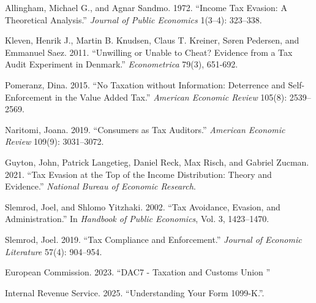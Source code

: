 \documentclass[11pt]{article}
\begin{document}
\newpage
\begin{thebibliography}{9}\small
{}
Allingham, Michael G., and Agnar Sandmo. 1972. ``Income Tax Evasion: A Theoretical Analysis.'' \textit{Journal of Public Economics} 1(3--4): 323--338.

Kleven, Henrik J., Martin B. Knudsen, Claus T. Kreiner, S\o ren Pedersen, and Emmanuel Saez. 2011. ``Unwilling or Unable to Cheat? Evidence from a Tax Audit Experiment in Denmark.'' \textit{Econometrica} 79(3), 651-692.

Pomeranz, Dina. 2015. ``No Taxation without Information: Deterrence and Self-Enforcement in the Value Added Tax.'' \textit{American Economic Review} 105(8): 2539--2569.

Naritomi, Joana. 2019. ``Consumers as Tax Auditors.'' \textit{American Economic Review} 109(9): 3031--3072.

Guyton, John, Patrick Langetieg, Daniel Reck, Max Risch, and Gabriel Zucman. 2021. ``Tax Evasion at the Top of the Income Distribution: Theory and Evidence.'' \textit{National Bureau of Economic Research}.

Slemrod, Joel, and Shlomo Yitzhaki. 2002. ``Tax Avoidance, Evasion, and Administration.'' In \textit{Handbook of Public Economics}, Vol. 3, 1423--1470.

Slemrod, Joel. 2019. ``Tax Compliance and Enforcement.'' \textit{Journal of Economic Literature} 57(4): 904--954.

European Commission. 2023. ``DAC7 - Taxation and Customs Union
'' 

Internal Revenue Service. 2025. ``Understanding Your Form 1099-K.''.

\end{thebibliography}
\end{document}

